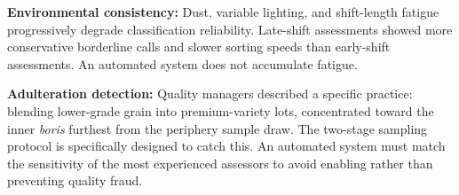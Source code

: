 \textbf{Environmental consistency:} Dust, variable lighting, and shift-length fatigue progressively degrade classification reliability. Late-shift assessments showed more conservative borderline calls and slower sorting speeds than early-shift assessments. An automated system does not accumulate fatigue.

\textbf{Adulteration detection:} Quality managers described a specific practice: blending lower-grade grain into premium-variety lots, concentrated toward the inner \textit{boris} furthest from the periphery sample draw. The two-stage sampling protocol is specifically designed to catch this. An automated system must match the sensitivity of the most experienced assessors to avoid enabling rather than preventing quality fraud.
